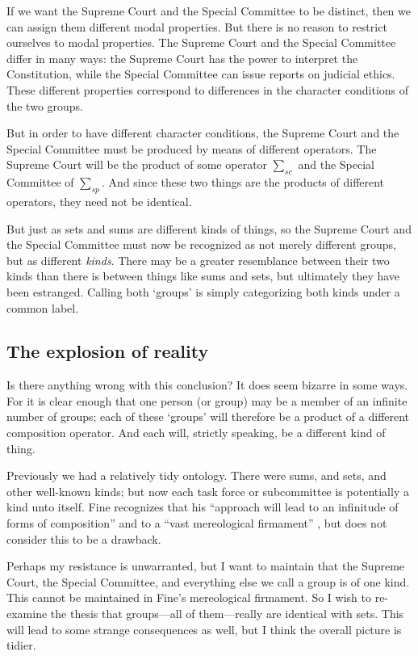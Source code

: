 \documentclass[11pt]{article}
\begin{document}
\begin{spacing}{1.5}
If we want the Supreme Court and the Special Committee to be distinct,
then we can assign them different modal properties.  But there is no
reason to restrict ourselves to modal properties.  The Supreme Court
and the Special Committee differ in many ways: the Supreme Court has
the power to interpret the Constitution, while the Special Committee
can issue reports on judicial ethics.  These different properties
correspond to differences in the character conditions of the two
groups.

But in order to have different character conditions, the Supreme Court
and the Special Committee must be produced by means of different
operators.  The Supreme Court will be the product of some operator
$\sum _{sc}$ and the Special Committee of $\sum _{sp}$.  And since
these two things are the products of different operators, they need
not be identical.

But just as sets and sums are different kinds of things, so the
Supreme Court and the Special Committee must now be recognized as not
merely different groups, but as different {\em kinds}.  There may be a
greater resemblance between their two kinds than there is between
things like sums and sets, but ultimately they have been estranged.
Calling both `groups' is simply categorizing both kinds under a common
label.

\subsection{The explosion of reality}
Is there anything wrong with this conclusion?  It does seem bizarre in
some ways.  For it is clear enough that one person (or group) may be a
member of an infinite number of groups; each of these `groups' will
therefore be a product of a different composition operator.  And each
will, strictly speaking, be a different kind of thing.

Previously we had a relatively tidy ontology.  There were sums, and
sets, and other well-known kinds; but now each task force or
subcommittee is potentially a kind unto itself.  Fine recognizes that
his ``approach will lead to an infinitude of forms of composition''
and to a ``vast mereological firmament'' \citeyearpar[576]{fine2010},
but does not consider this to be a drawback.

Perhaps my resistance is unwarranted, but I want to maintain that the
Supreme Court, the Special Committee, and everything else we call a
group is of one kind.  This cannot be maintained in Fine's
mereological firmament.  So I wish to re-examine the thesis that
groups---all of them---really are identical with sets.  This will lead
to some strange consequences as well, but I think the overall picture
is tidier.


\end{spacing}
\end{document}
